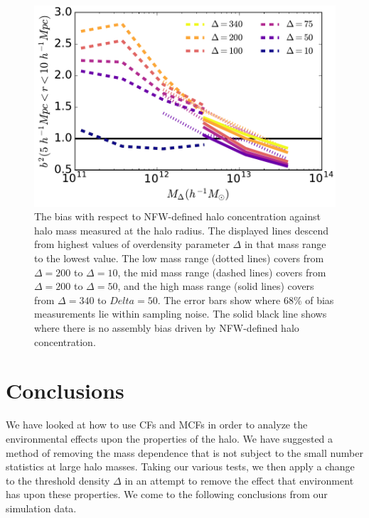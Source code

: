 \documentclass[usenatbib]{mnras}
\begin{document}
\begin{figure}
	\centering
	\includegraphics[width=.4\textwidth]{biasplot.pdf}
	\caption{The bias with respect to NFW-defined halo concentration against halo mass measured at the halo
	radius. The displayed lines descend from highest values of overdensity parameter $\Delta$ in that mass
	range to the lowest value. The low mass range (dotted lines) covers from $\Delta=200$ to $\Delta=10$, 
	the mid mass range (dashed lines) covers	from $\Delta=200$ to $\Delta=50$, and the 
	high mass range (solid lines) covers from $\Delta=340$ to $Delta=50$. The
	error bars show where 68\% of bias measurements lie within sampling noise. The solid black line
	shows where there is no assembly bias driven by NFW-defined halo concentration.}
	\label{fig:biascompare}
\end{figure}


\section[]{Conclusions}
\label{section:conclusions}

We have looked at how to use CFs and MCFs in order to analyze the environmental effects upon the properties of the halo. We have suggested a method of removing the mass dependence that is not subject to the small number statistics at large halo masses. Taking our various tests, we then apply a change to the threshold density $\Delta$ in an attempt to remove the effect that environment has upon these properties. We come to the following conclusions from our simulation data.
\end{document}
